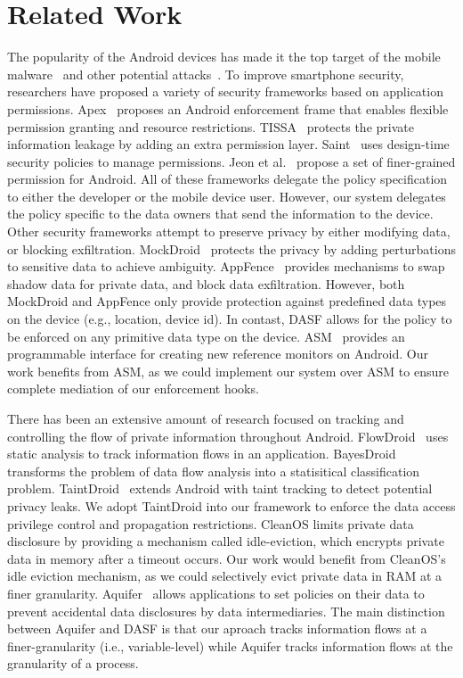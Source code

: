 \section{Related Work}
The popularity of the Android devices has made it the top target of the mobile
malware~\cite{Felt,Becher,xjiang_oak12} and other potential
attacks~\cite{Fahl,Lu_ccs12}. To improve smartphone security, researchers have
proposed a variety of security frameworks based on application permissions.
Apex~\cite{Nauman} proposes an Android enforcement frame that enables flexible
permission granting and resource restrictions. TISSA~\cite{xjiang_11} protects
the private information leakage by adding an extra permission layer.
Saint~\cite{Ongtang} uses design-time security policies to manage permissions.
Jeon et al.~\cite{jmv+12} propose a set of finer-grained permission for
Android.  All of these frameworks delegate the policy specification to either
the developer or the mobile device user. However, our system delegates the
policy specific to the data owners that send the information to the device.
Other security frameworks attempt to preserve privacy by either modifying data,
or blocking exfiltration.  MockDroid~\cite{Beresford} protects the privacy by
adding perturbations to sensitive data to achieve ambiguity.
AppFence~\cite{Hornyack} provides mechanisms to swap shadow data for private
data, and block data exfiltration.  However, both MockDroid and AppFence only
provide protection against predefined data types on the device (e.g., location,
device id). In contast, DASF allows for the policy to be enforced on any
primitive data type on the device.  ASM~\cite{hnes14} provides an programmable
interface for creating new reference monitors on Android. Our work benefits
from ASM, as we could implement our system over ASM to ensure complete
mediation of our enforcement hooks.

There has been an extensive amount of research focused on tracking and
controlling the flow of private information throughout Android.
FlowDroid~\cite{arf+14} uses static analysis to track information flows in an
application. BayesDroid~\cite{oj14} transforms the problem of data flow
analysis into a statisitical classification problem.
TaintDroid~\cite{taintdroid} extends Android with taint tracking to detect
potential privacy leaks.  We adopt TaintDroid into our framework to enforce the
data access privilege control and propagation restrictions.
CleanOS\cite{tab+13} limits private data disclosure by providing a mechanism
called idle-eviction, which encrypts private data in memory after a timeout
occurs. Our work would benefit from CleanOS's idle eviction mechanism, as we
could selectively evict private data in RAM at a finer granularity.
Aquifer~\cite{ne13} allows applications to set policies on their data to
prevent accidental data disclosures by data intermediaries. The main
distinction between Aquifer and DASF is that our aproach tracks information
flows at a finer-granularity (i.e., variable-level) while Aquifer tracks
information flows at the granularity of a process. 


